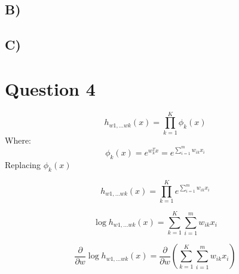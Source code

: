 \documentclass{report}
\begin{document}
\subsection*{B)}
\subsection*{C)}


\section*{Question 4}

  \begin{equation}
    h_{w1,...wk}(x)
    = \prod_{k=1}^{K}\phi_k(x)
  \end{equation}
Where:
  \begin{equation}
    \phi_k(x) = e^{w_k^Tx}
    = e^{\sum_{i=1}^m w_{ik}x_i}
  \end{equation}
Replacing $\phi_k(x)$

  \begin{equation}
    h_{w1,...wk}(x)
    = \prod_{k=1}^{K}e^{\sum_{i=1}^m w_{ik}x_i}
  \end{equation}

  \begin{equation}
    \log h_{w1,...wk}(x)
    = \sum_{k=1}^{K} \sum_{i=1}^m w_{ik}x_i
  \end{equation}

  \begin{equation}
    \frac{\partial}{\partial w} \log h_{w1,...wk}(x)
    = \frac{\partial}{\partial w} \left(\sum_{k=1}^{K} \sum_{i=1}^m w_{ik}x_i\right)
  \end{equation}
\end{document}
